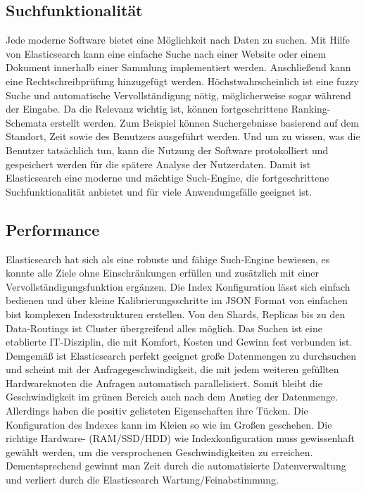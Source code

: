 \subsection{Suchfunktionalität}
Jede moderne Software bietet eine Möglichkeit nach Daten zu suchen. Mit Hilfe von Elasticsearch kann eine einfache Suche nach einer Website oder einem Dokument innerhalb einer Sammlung implementiert werden. Anschließend kann eine Rechtschreibprüfung hinzugefügt werden. Höchstwahrscheinlich ist eine fuzzy Suche und automatische Vervollständigung nötig, möglicherweise sogar während der Eingabe. Da die Relevanz wichtig ist, können fortgeschrittene Ranking-Schemata erstellt werden. Zum Beispiel können Suchergebnisse basierend auf dem Standort, Zeit sowie des Benutzers ausgeführt werden. Und um zu wissen, was die Benutzer tatsächlich tun, kann die Nutzung der Software protokolliert und gespeichert werden für die spätere Analyse der Nutzerdaten.
\newline
Damit ist Elasticsearch eine moderne und mächtige Such-Engine, die fortgeschrittene Suchfunktionalität anbietet und für viele Anwendungsfälle geeignet ist.

\subsection{Performance}
Elasticsearch hat sich als eine robuste und fähige Such-Engine bewiesen, es konnte alle Ziele ohne Einschränkungen erfüllen und zusätzlich mit einer Vervollständigungsfunktion ergänzen. Die Index Konfiguration lässt sich einfach bedienen und über kleine Kalibrierungsschritte im JSON Format von einfachen bist komplexen Indexstrukturen erstellen. Von den Shards, Replicas bis zu den Data-Routings ist Cluster übergreifend alles möglich. Das Suchen ist eine etablierte IT-Disziplin, die mit Komfort, Kosten und Gewinn fest verbunden ist. Demgemäß ist Elasticsearch perfekt geeignet große Datenmengen zu durchsuchen und scheint mit der Anfragegeschwindigkeit, die mit jedem weiteren gefüllten Hardwareknoten die Anfragen automatisch parallelisiert. 
Somit bleibt die Geschwindigkeit im grünen Bereich auch nach dem Anstieg der Datenmenge.  
Allerdings haben die positiv gelisteten Eigenschaften ihre Tücken. Die Konfiguration des Indexes kann im Kleien so wie im Großen geschehen. Die richtige Hardware- (RAM/SSD/HDD) wie Indexkonfiguration muss gewissenhaft gewählt werden, um die versprochenen Geschwindigkeiten zu erreichen. Dementsprechend gewinnt man Zeit durch die automatisierte Datenverwaltung und verliert durch die Elasticsearch Wartung/Feinabstimmung. 

